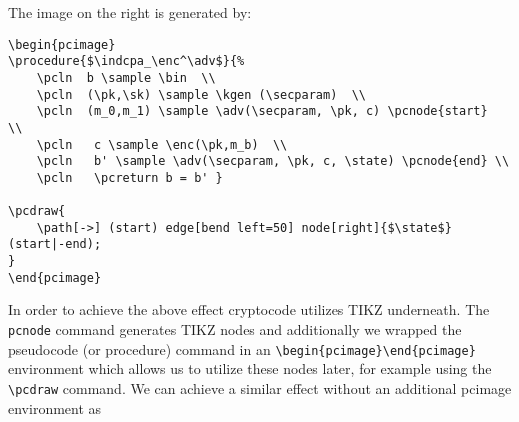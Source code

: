 \documentclass[a4paper]{report}
\begin{document}
\begin{center}

\end{center}

The image on the right is generated by:
\begin{lstlisting}
\begin{pcimage}
\procedure{$\indcpa_\enc^\adv$}{%
	\pcln  b \sample \bin  \\
	\pcln  (\pk,\sk) \sample \kgen (\secparam)  \\
	\pcln  (m_0,m_1) \sample \adv(\secparam, \pk, c) \pcnode{start}  \\
	\pcln   c \sample \enc(\pk,m_b)  \\
	\pcln   b' \sample \adv(\secparam, \pk, c, \state) \pcnode{end} \\
	\pcln   \pcreturn b = b' }
	
\pcdraw{
	\path[->] (start) edge[bend left=50] node[right]{$\state$} (start|-end);
}
\end{pcimage}
\end{lstlisting}

In order to achieve the above effect cryptocode utilizes TIKZ underneath. The
\lstinline$pcnode$ command generates TIKZ nodes and additionally we wrapped the 
pseudocode (or procedure) command in an \lstinline$\begin{pcimage}\end{pcimage}$ environment
which allows us to utilize these nodes later, for example using the  \lstinline$\pcdraw$
command. We can achieve a similar effect without an additional pcimage environment as
\end{document}
